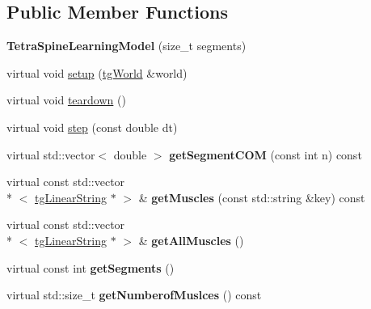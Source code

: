 \subsection*{Public Member Functions}
\begin{DoxyCompactItemize}
\item 
\hypertarget{class_tetra_spine_learning_model_a8e8ecbd2fd6b5fd9c8a2dc6b190b6d34}{{\bfseries Tetra\-Spine\-Learning\-Model} (size\-\_\-t segments)}\label{class_tetra_spine_learning_model_a8e8ecbd2fd6b5fd9c8a2dc6b190b6d34}

\item 
virtual void \hyperlink{class_tetra_spine_learning_model_a78f283f3a2479c9af5b43cef52f2428f}{setup} (\hyperlink{classtg_world}{tg\-World} \&world)
\item 
virtual void \hyperlink{class_tetra_spine_learning_model_a242f0c007fb565c278a26b4efcc299f4}{teardown} ()
\item 
virtual void \hyperlink{class_tetra_spine_learning_model_a5b3b6e1543c56deafe50d7cf3478ebfe}{step} (const double dt)
\item 
\hypertarget{class_base_spine_model_learning_afd3d71b99a2105a60c78d52d67068c00}{virtual std\-::vector$<$ double $>$ {\bfseries get\-Segment\-C\-O\-M} (const int n) const }\label{class_base_spine_model_learning_afd3d71b99a2105a60c78d52d67068c00}

\item 
\hypertarget{class_base_spine_model_learning_a0c595346fb7a23e89d9f6ec572a19c49}{virtual const std\-::vector\\*
$<$ \hyperlink{classtg_linear_string}{tg\-Linear\-String} $\ast$ $>$ \& {\bfseries get\-Muscles} (const std\-::string \&key) const }\label{class_base_spine_model_learning_a0c595346fb7a23e89d9f6ec572a19c49}

\item 
\hypertarget{class_base_spine_model_learning_a508eae423b9fd9e194b620563b15b9db}{virtual const std\-::vector\\*
$<$ \hyperlink{classtg_linear_string}{tg\-Linear\-String} $\ast$ $>$ \& {\bfseries get\-All\-Muscles} ()}\label{class_base_spine_model_learning_a508eae423b9fd9e194b620563b15b9db}

\item 
\hypertarget{class_base_spine_model_learning_af38ddf518f0b9d524d869591216070fd}{virtual const int {\bfseries get\-Segments} ()}\label{class_base_spine_model_learning_af38ddf518f0b9d524d869591216070fd}

\item 
\hypertarget{class_base_spine_model_learning_a21c0b6e4c84e4f61b92d803dd677525f}{virtual std\-::size\-\_\-t {\bfseries get\-Numberof\-Muslces} () const }\label{class_base_spine_model_learning_a21c0b6e4c84e4f61b92d803dd677525f}


\end{DoxyCompactItemize}
